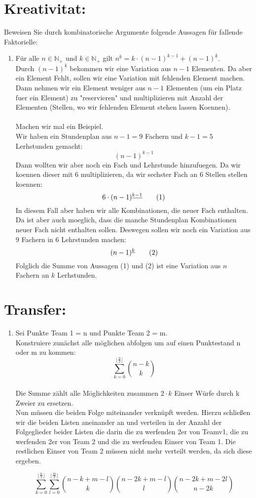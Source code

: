     \section*{Kreativitat:}
    Beweisen Sie durch kombinatorische Argumente folgende Aussagen für fallende Faktorielle:
    \begin{enumerate}[label=(\alph*)]
    \item Für alle $n \in \mathbb{N}_+$ und $k \in \mathbb{N}_+$ gilt 	
    $n^{\underline{k}} = k \cdot (n-1)^{\underline{k-1}} +(n-1)^{\underline{k}}$.\\
    Durch $(n-1)^{\underline{k}}$ bekommen wir eine Variation aus $n-1$ Elementen.
    Da aber ein Element Fehlt, sollen wir eine Variation mit fehlenden Element machen.
    Dann nehmen wir ein Element weniger aus $n-1$ Elementen (um ein Platz fuer ein Element) 
    zu "reservieren" und multiplizieren mit Anzahl der Elementen (Stellen, wo wir
    fehlenden Element stehen lassen Koennen). \\\\
    Machen wir mal ein Beispiel.\\
    Wir haben ein Stundenplan aus $n-1 = 9$ Fachern und $k-1 = 5$ Lerhstunden gemacht:
    \[(n-1)^{\underline{k-1}}\]
    Dann wollten wir aber noch ein Fach und Lehrstunde hinzufuegen. Da wir koennen
    dieser mit 6 multiplizieren, da wir sechster Fach an 6 Stellen stellen koennen: 
    \[6\cdot(n-1)^{\underline{k-1}} \textrm{\qquad (1)}\]
    In diesem Fall aber haben wir alle Kombinationen, die neuer Fach enthalten. 
    Da ist aber auch moeglich, dass die manche Stundenplan Kombinationen neuer Fach 
    nicht enthalten sollen. Deswegen sollen wir noch ein Variation aus 9 Fachern 
    in 6 Lehrstunden machen: 
    \[(n-1)^{\underline{k}} \textrm{\qquad (2)}\]
    Folglich die Summe von Aussagen (1) und (2) ist eine Variation aus $n$ Fachern 
    an $k$ Lerhstunden. 
        \end{enumerate}
    \section*{Transfer:}
    \begin{enumerate}[label=(\alph*)]
\item Sei Punkte Team 1 = n und Punkte Team 2 = m.\\
		Konstruiere zunächst alle möglichen abfolgen um auf einen Punktestand n oder m zu kommen:
		$$\sum\limits_{k=0}^{\lfloor \frac{n}{2} \rfloor}\binom{n-k}{k}$$\\
		Die Summe zählt alle Möglichkeiten zusammen $2 \cdot k$ Einser Würfe durch k Zweier zu ersetzen. 
		\\
		Nun müssen die beiden Folge miteinander verknüpft werden.
		Hierzu schließen wir die beiden Listen aneinander an und verteilen in der Anzahl der Folgeglieder beider Listen die darin die zu werfenden 2er von Teamv1, die zu werfenden 2er von Team 2 und die zu werfenden Einser von Team 1. Die restlichen Einser von Team 2 müssen nicht mehr verteilt werden, da sich diese ergeben.
		
		$$ \sum\limits_{k=0}^{\lfloor \frac{n}{2} \rfloor} \sum\limits_{l=0}^{\lfloor\frac{m}{2}\rfloor}\binom{n-k+m-l}{k}\binom{n-2k+m-l}{l}\binom{n-2k+m-2l}{n-2k}$$
    \end{enumerate}
